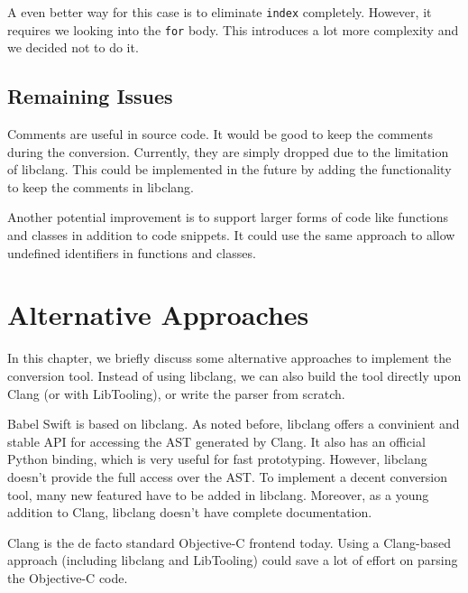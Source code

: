 \documentclass{sfuthesis}
\begin{document}
A even better way for this case is to eliminate \texttt{index} completely. However, it requires we looking into the \texttt{for} body. This introduces a lot more complexity and we decided not to do it.

%
%
%


\section{Remaining Issues}

Comments are useful in source code. It would be good to keep the comments during the conversion. Currently, they are simply dropped due to the limitation of libclang. This could be implemented in the future by adding the functionality to keep the comments in libclang.

Another potential improvement is to support larger forms of code like functions and classes in addition to code snippets. It could use the same approach to allow undefined identifiers in functions and classes.

\chapter{Alternative Approaches}

In this chapter, we briefly discuss some alternative approaches to implement the conversion tool. Instead of using libclang, we can also build the tool directly upon Clang (or with LibTooling), or write the parser from scratch.

Babel Swift is based on libclang. As noted before, libclang offers a convinient and stable API for accessing the AST generated by Clang. It also has an official Python binding, which is very useful for fast prototyping. However, libclang doesn't provide the full access over the AST. To implement a decent conversion tool, many new featured have to be added in libclang. Moreover, as a young addition to Clang, libclang doesn't have complete documentation.

Clang is the de facto standard Objective-C frontend today. Using a Clang-based approach (including libclang and LibTooling) could save a lot of effort on parsing the Objective-C code.
\end{document}
